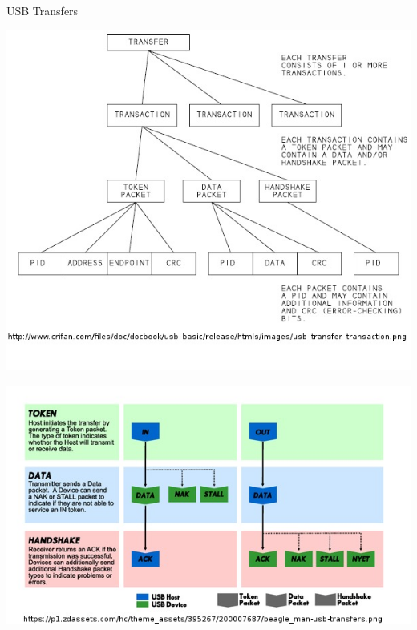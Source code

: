 \documentclass[pdf]{beamer}
\begin{document}
\begin{frame}{USB Transfers}
  \transdissolve
  \begin{minipage}{.45\linewidth}
    \includegraphics[scale=0.25]{img/usb_transfer.jpg}
  \end{minipage}
  \hspace{.05\linewidth}
  \begin{minipage}{.45\linewidth}
    \includegraphics[scale=0.3]{img/usb_transaction.jpg}
  \end{minipage}
\end{frame}
\end{document}

